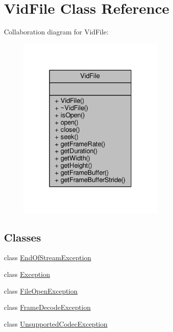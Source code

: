 \hypertarget{classVidFile}{}\section{Vid\+File Class Reference}
\label{classVidFile}


Collaboration diagram for Vid\+File\+:
\nopagebreak
\begin{figure}[H]
\begin{center}
\leavevmode
\includegraphics[width=205pt]{d2/d1c/classVidFile__coll__graph}
\end{center}
\end{figure}
\subsection*{Classes}
\begin{DoxyCompactItemize}
\item 
class \hyperlink{classVidFile_1_1EndOfStreamException}{End\+Of\+Stream\+Exception}
\item 
class \hyperlink{classVidFile_1_1Exception}{Exception}
\item 
class \hyperlink{classVidFile_1_1FileOpenException}{File\+Open\+Exception}
\item 
class \hyperlink{classVidFile_1_1FrameDecodeException}{Frame\+Decode\+Exception}
\item 
class \hyperlink{classVidFile_1_1UnsupportedCodecException}{Unsupported\+Codec\+Exception}
\end{DoxyCompactItemize}

